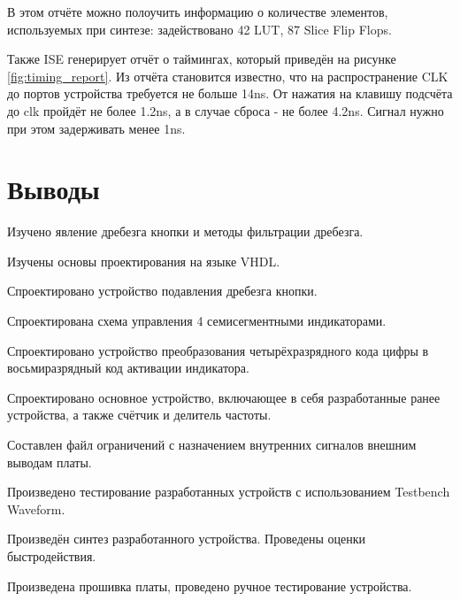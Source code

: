 \documentclass[a4paper, 14pt]{extarticle}
\begin{document}
    В этом отчёте можно полоучить информацию о количестве элементов, используемых при синтезе:
    задействовано 42 LUT, 87 Slice Flip Flops.

    Также ISE генерирует отчёт о таймингах, который приведён на рисунке \ref{fig:timing_report}.
    Из отчёта становится известно, что на распространение CLK до портов устройства требуется не больше 14ns. От нажатия на клавишу подсчёта до clk пройдёт не более 1.2ns, а в случае сброса - не более 4.2ns. Сигнал нужно при этом задерживать менее 1ns.

    \pagebreak
    \section*{Выводы}
    Изучено явление дребезга кнопки и методы фильтрации дребезга.
    
    Изучены основы проектирования на языке VHDL.

    Спроектировано устройство подавления дребезга кнопки.

    Спроектирована схема управления 4 семисегментными индикаторами.

    Спроектировано устройство преобразования четырёхразрядного кода цифры в восьмиразрядный код активации индикатора.

    Спроектировано основное устройство, включающее в себя разработанные ранее устройства, а также счётчик и делитель частоты.

    Составлен файл ограничений с назначением внутренних сигналов внешним выводам платы.

    Произведено тестирование разработанных устройств с использованием Testbench Waveform.
    
    Произведён синтез разработанного устройства. Проведены оценки быстродействия.

    Произведена прошивка платы, проведено ручное тестирование устройства.
\end{document}
